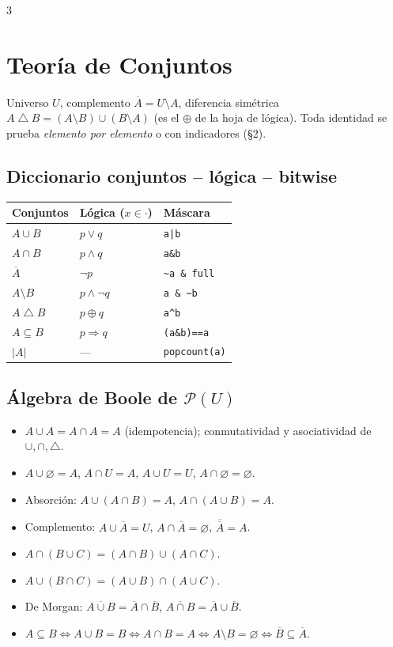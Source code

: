 \documentclass[8pt, spanish, mexico, letterpaper]{extarticle}
\newcommand{\<}{<}
\newcommand{\ov}[1]{\overline{#1}}
\newcommand{\sd}{\mathbin{\triangle}}
\newcommand{\Pw}{\mathcal{P}}
\newcommand{\card}[1]{\left|#1\right|}
\newcommand{\bor}{\texttt{|}}
\newcommand{\band}{\texttt{\&}}
\begin{document}
\begin{multicols*}{3}
\section{Teoría de Conjuntos}

Universo $U$, complemento $\ov{A}=U\setminus A$, diferencia sim\'etrica
$A\sd B=(A\setminus B)\cup(B\setminus A)$ (es el $\oplus$ de la hoja de l\'ogica).
Toda identidad se prueba \emph{elemento por elemento} o con indicadores (\S2).
 
\subsection{Diccionario conjuntos -- l\'ogica -- bitwise}
\begin{center}
\begin{tabular}{@{}lll@{}}
\hline
Conjuntos & L\'ogica ($x\in\cdot$) & M\'ascara \\
\hline
$A\cup B$ & $p\lor q$ & \texttt{a\bor b} \\
$A\cap B$ & $p\land q$ & \texttt{a\band b} \\
$\ov A$ & $\lnot p$ & \texttt{\textasciitilde a \band{} full} \\
$A\setminus B$ & $p\land\lnot q$ & \texttt{a \band{} \textasciitilde b} \\
$A\sd B$ & $p\oplus q$ & \texttt{a\textasciicircum b} \\
$A\subseteq B$ & $p\Rightarrow q$ & \texttt{(a\band b)==a} \\
$\card{A}$ & --- & \texttt{popcount(a)} \\
\hline
\end{tabular}
\end{center}
 
\subsection{\'Algebra de Boole de $\Pw(U)$}
\begin{itemize}
  \item $A\cup A=A\cap A=A$ \quad (idempotencia); conmutatividad y asociatividad de $\cup,\cap,\sd$.
  \item $A\cup\varnothing=A$, \; $A\cap U=A$, \; $A\cup U=U$, \; $A\cap\varnothing=\varnothing$.
  \item Absorci\'on: $A\cup(A\cap B)=A$, \quad $A\cap(A\cup B)=A$.
  \item Complemento: $A\cup\ov A=U$, \; $A\cap\ov A=\varnothing$, \; $\ov{\ov A}=A$.
  \item $A\cap(B\cup C)=(A\cap B)\cup(A\cap C)$.
  \item $A\cup(B\cap C)=(A\cup B)\cap(A\cup C)$.
  \item De Morgan: $\ov{A\cup B}=\ov A\cap\ov B$, \quad $\ov{A\cap B}=\ov A\cup\ov B$.
  \item $A\subseteq B \iff A\cup B=B \iff A\cap B=A \iff A\setminus B=\varnothing \iff \ov B\subseteq\ov A$.
\end{itemize}
 

\end{multicols*}
\end{document}

